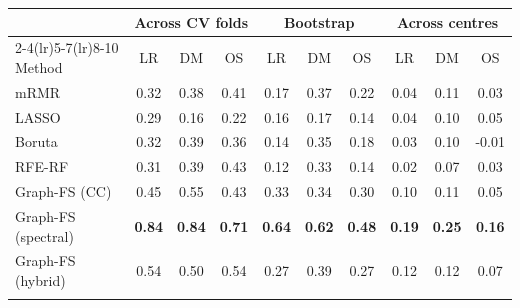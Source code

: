 \begin{tabular}{@{}lccccccccc@{}}
\toprule
 & \multicolumn{3}{c}{Across CV folds} & \multicolumn{3}{c}{Bootstrap} & \multicolumn{3}{c}{Across centres} \\
\cmidrule(lr){2-4}\cmidrule(lr){5-7}\cmidrule(lr){8-10}
Method & LR & DM & OS & LR & DM & OS & LR & DM & OS \\
\midrule
mRMR & 0.32 & 0.38 & 0.41 & 0.17 & 0.37 & 0.22 & 0.04 & 0.11 & 0.03 \\
LASSO & 0.29 & 0.16 & 0.22 & 0.16 & 0.17 & 0.14 & 0.04 & 0.10 & 0.05 \\
Boruta & 0.32 & 0.39 & 0.36 & 0.14 & 0.35 & 0.18 & 0.03 & 0.10 & -0.01 \\
RFE-RF & 0.31 & 0.39 & 0.43 & 0.12 & 0.33 & 0.14 & 0.02 & 0.07 & 0.03 \\
Graph-FS (CC) & 0.45 & 0.55 & 0.43 & 0.33 & 0.34 & 0.30 & 0.10 & 0.11 & 0.05 \\
Graph-FS (spectral) & \textbf{0.84} & \textbf{0.84} & \textbf{0.71} & \textbf{0.64} & \textbf{0.62} & \textbf{0.48} & \textbf{0.19} & \textbf{0.25} & \textbf{0.16} \\
Graph-FS (hybrid) & 0.54 & 0.50 & 0.54 & 0.27 & 0.39 & 0.27 & 0.12 & 0.12 & 0.07 \\
\botrule
\end{tabular}
